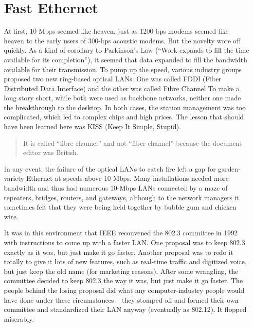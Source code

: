 \section{Fast Ethernet}

At first, 10 Mbps seemed like heaven, just as 1200-bps modems seemed
like heaven to the early users of 300-bps acoustic modems. But the
novelty wore off quickly. As a kind of corollary to Parkinson's Law
(``Work expands to fill the time available for its completion''), it
seemed that data expanded to fill the bandwidth available for their
transmission. To pump up the speed, various industry groups proposed two
new ring-based optical LANs. One was called {FDDI} ({Fiber Distributed
Data Interface}) and the other was called {Fibre Channel}
To make a long story short, while both were used as backbone networks,
neither one made the breakthrough to the desktop. In both cases, the
station management was too complicated, which led to complex chips and
high prices. The lesson that should have been learned here was KISS
(Keep It Simple, Stupid).

\begin{quote}
It is called ``fibre channel'' and not ``fiber channel'' because the
document editor was British.
\end{quote}

In any event, the failure of the optical LANs to catch fire left a gap
for garden-variety Ethernet at speeds above 10 Mbps. Many installations
needed more bandwidth and thus had numerous 10-Mbps LANs connected by a
maze of repeaters, bridges, routers, and gateways, although to the
network managers it sometimes felt that they were being held together by
bubble gum and chicken wire.

It was in this environment that IEEE reconvened the 802.3 committee in
1992 with instructions to come up with a faster LAN. One proposal was to
keep 802.3 exactly as it was, but just make it go faster. Another
proposal was to redo it totally to give it lots of new features, such as
real-time traffic and digitized voice, but just keep the old name (for
marketing reasons). After some wrangling, the committee decided to keep
802.3 the way it was, but just make it go faster. The people behind the
losing proposal did what any computer-industry people would have done
under these circumstances -- they stomped off and formed their own
committee and standardized their LAN anyway (eventually as 802.12). It
flopped miserably.

